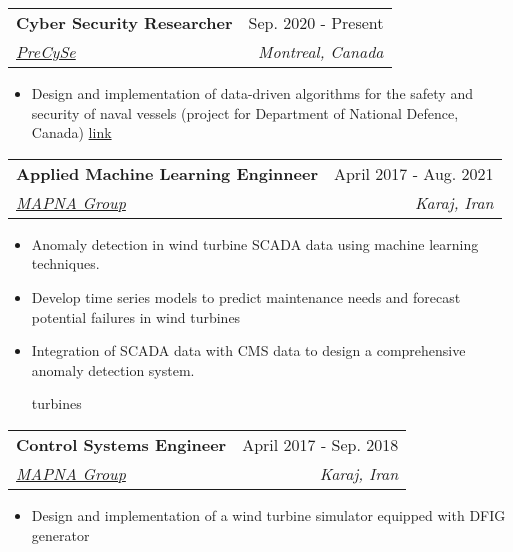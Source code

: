 \documentclass[letterpaper,10.8pt]{article}
\makeatletter
\newcommand{\resumeSubheading}[4]{
  \vspace{-1pt}\item
    \begin{tabular*}{0.97\textwidth}{l@{\extracolsep{\fill}}r}
      \textbf{#1} & #2 \\
      \textit{\small#3} & \textit{\small #4} \\
    \end{tabular*}\vspace{-5pt}
}
\makeatother
\begin{document}
    \resumeSubheading
    {Cyber Security Researcher}{Sep. 2020 - Present}
      {\href{https://users.encs.concordia.ca/~wlucia/Research.html}{PreCySe}}{Montreal, Canada}
      {\small
	   \begin{itemize}
            \item Design and implementation of  data-driven algorithms for the safety and security of naval vessels (project for Department of National Defence, Canada) \href{https://www.concordia.ca/news/stories/2022/11/21/the-department-of-national-defence-awards-concordia-researcher-1-m-to-develop-new-strategies-against-cyberattacks.html}{link} 
	   \end{itemize}
	   
	   }

%   
    \resumeSubheading
      {Applied Machine Learning Enginneer}{April 2017 - Aug. 2021}
      {\href{https://mapnagroup.com/?lang=en}{MAPNA Group}}{Karaj, Iran}
      
	   {\small
	   \begin{itemize}
    \justifying
	       \item Anomaly detection in wind turbine SCADA data using machine learning techniques.
        \item Develop time series models to predict maintenance needs and forecast potential failures in wind turbines
        \item Integration of SCADA data with CMS data to design a comprehensive anomaly detection system. 
        
%
turbines
	   \end{itemize}
	   
	   }
	   \resumeSubheading
      {Control Systems Engineer}{April 2017 - Sep. 2018}
      {\href{https://mapnagroup.com/?lang=en}{MAPNA Group}}{Karaj, Iran}
      
	   {\small 
	   \begin{itemize}
%
\item Design and implementation of a wind turbine simulator equipped with DFIG generator 
	   \end{itemize}
	   
	   }
	   
\end{document}
